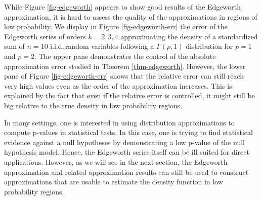 \begin{example}
    While Figure \ref{fig-edgeworth} appears to show good results of the Edgeworth approximation, it is hard to assess the quality of the approximations in regions of low probability. We display in Figure \ref{fig-edgeworth-err} the error of the Edgeworth series of orders $k=2,3,4$ approximating the density of a standardized sum of $n=10$ i.i.d.\,random variables following a $\Gamma(p, 1)$ distribution for $p=1$ and $p=2$. The upper pane demonstrates the control of the absolute approximation error studied in Theorem \ref{thm-edgeworth}. However, the lower pane of Figure \ref{fig-edgeworth-err} shows that the relative error can still reach very high values even as the order of the approximation increases. This is explained by the fact that even if the relative error is controlled, it might still be big relative to the true density in low probability regions.

    In many settings, one is interested in using distribution approximations to compute p-values in statistical tests. In this case, one is trying to find statistical evidence against a null hypotheses by demonstrating a low p-value of the null hypothesis model. Hence, the Edgeworth series itself can be ill suited for direct applications. However, as we will see in the next section, the Edgeworth approximation and related approximation results can still be used to construct approximations that are usable to estimate the density function in low probability regions.
\end{example}